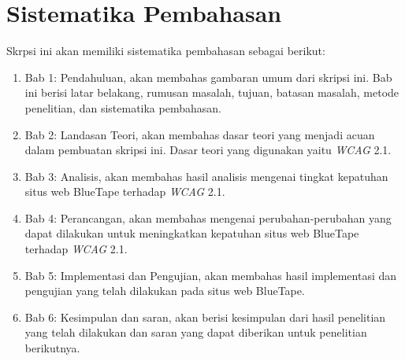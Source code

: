 \section{Sistematika Pembahasan}
\label{sec:sispem}
Skrpsi ini akan memiliki sistematika pembahasan sebagai berikut: 
\begin{enumerate}
	\item Bab 1: Pendahuluan, akan membahas gambaran umum dari skripsi ini. Bab ini berisi latar belakang, rumusan masalah, tujuan, batasan masalah, metode penelitian, dan sistematika pembahasan.
	\item Bab 2: Landasan Teori, akan membahas dasar teori yang menjadi acuan dalam pembuatan skripsi ini. Dasar teori yang digunakan yaitu \textit{WCAG} 2.1.
	\item Bab 3: Analisis, akan membahas hasil analisis mengenai tingkat kepatuhan situs web BlueTape terhadap \textit{WCAG} 2.1.
	\item Bab 4: Perancangan, akan membahas mengenai perubahan-perubahan yang dapat dilakukan untuk meningkatkan kepatuhan situs web BlueTape terhadap \textit{WCAG} 2.1.
	\item Bab 5: Implementasi dan Pengujian, akan membahas hasil implementasi dan pengujian yang telah dilakukan pada situs web BlueTape.
	\item Bab 6: Kesimpulan dan saran, akan berisi kesimpulan dari hasil penelitian yang telah dilakukan dan saran yang dapat diberikan untuk penelitian berikutnya.
\end{enumerate}